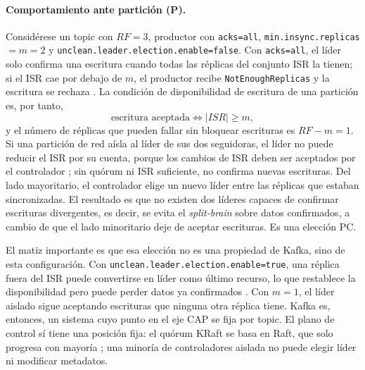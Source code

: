 \documentclass[11pt,a4paper]{article}
\begin{document}
\paragraph{Comportamiento ante partición (P).}
Considérese un topic con $RF=3$, productor con \texttt{acks=all}, \texttt{min.insync.replicas}$=m=2$ y \texttt{unclean.leader.election.enable=false}. Con \texttt{acks=all}, el líder solo confirma una escritura cuando todas las réplicas del conjunto ISR la tienen; si el ISR cae por debajo de $m$, el productor recibe \texttt{NotEnoughReplicas} y la escritura se rechaza \cite{kafkadocs}. La condición de disponibilidad de escritura de una partición es, por tanto,
\begin{equation}
\text{escritura aceptada} \iff |ISR| \geq m,
\label{eq:isr}
\end{equation}
y el número de réplicas que pueden fallar sin bloquear escrituras es $RF - m = 1$. Si una partición de red aísla al líder de sus dos seguidoras, el líder no puede reducir el ISR por su cuenta, porque los cambios de ISR deben ser aceptados por el controlador \cite{kip497}; sin quórum ni ISR suficiente, no confirma nuevas escrituras. Del lado mayoritario, el controlador elige un nuevo líder entre las réplicas que estaban sincronizadas. El resultado es que no existen dos líderes capaces de confirmar escrituras divergentes, es decir, se evita el \emph{split-brain} sobre datos confirmados, a cambio de que el lado minoritario deje de aceptar escrituras. Es una elección PC.

El matiz importante es que esa elección no es una propiedad de Kafka, sino de esta configuración. Con \texttt{unclean.leader.election.enable=true}, una réplica fuera del ISR puede convertirse en líder como último recurso, lo que restablece la disponibilidad pero puede perder datos ya confirmados \cite{kafkadocs}. Con $m=1$, el líder aislado sigue aceptando escrituras que ninguna otra réplica tiene. Kafka es, entonces, un sistema cuyo punto en el eje CAP se fija por topic. El plano de control sí tiene una posición fija: el quórum KRaft se basa en Raft, que solo progresa con mayoría \cite{ongaro2014raft,kip500}; una minoría de controladores aislada no puede elegir líder ni modificar metadatos.
\end{document}
